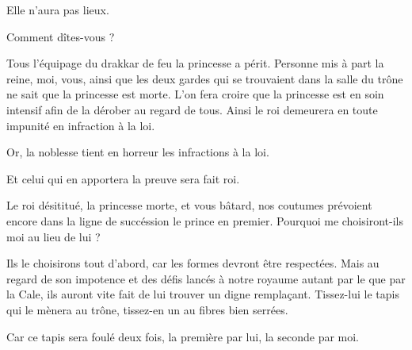 \begin{drama}
  \elenaspeaks Elle n’aura pas lieux.

  \generalspeaks Comment dîtes-vous ?

  \elenaspeaks Tous l’équipage du drakkar de feu la princesse \princesse{} a périt. Personne mis à part la reine, moi, vous, ainsi que les deux gardes qui se trouvaient dans la salle du trône ne sait que la princesse est morte. L’on fera croire que la princesse est en soin intensif afin de la dérober au regard de tous. Ainsi le roi demeurera en toute impunité en infraction à la loi.

  \generalspeaks Or, la noblesse tient en horreur les infractions à la loi.

  \elenaspeaks Et celui qui en apportera la preuve sera fait roi.

  \generalspeaks Le roi désititué, la princesse \princesse morte, et vous bâtard, nos coutumes prévoient encore dans la ligne de succéssion le prince \vladimir{} en premier. Pourquoi me choisiront-ils moi au lieu de lui ?

  \elenaspeaks Ils le choisirons tout d’abord, car les formes devront être respectées. Mais au regard de son impotence et des défis lancés à notre royaume autant par le \campoppose que par la Cale, ils auront vite fait de lui trouver un digne remplaçant. Tissez-lui le tapis qui le mènera au trône, tissez-en un au fibres bien serrées.

  \generalspeaks Car ce tapis sera foulé deux fois, la première par lui, la seconde par moi.
\end{drama}

\scene

\StageDirII{\general, \nobleOne, \nobleTwo, \nobleTree}


